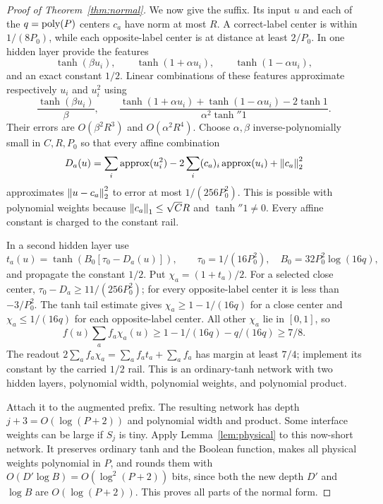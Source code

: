 \begin{proof}[Proof of Theorem~\ref{thm:normal}]
We now give the suffix. Its input $u$ and each of the $q=\operatorname{poly}(P)$
centers $c_a$ have norm at most $R$. A correct-label center is
within $1/(8P_0)$, while each opposite-label center is at distance
at least $2/P_0$. In one hidden layer provide the features
\[
 \tanh(\beta u_i),\qquad
 \tanh(1+\alpha u_i),\qquad\tanh(1-\alpha u_i),
\]
and an exact constant $1/2$. Linear combinations of these features
approximate respectively $u_i$ and $u_i^2$ using
\[
 \frac{\tanh(\beta u_i)}\beta,\qquad
 \frac{\tanh(1+\alpha u_i)+\tanh(1-\alpha u_i)-2\tanh1}
      {\alpha^2\tanh''1}.
\]
Their errors are $O(\beta^2R^3)$ and $O(\alpha^2R^4)$.
Choose $\alpha,\beta$ inverse-polynomially small in
$C,R,P_0$ so that every affine combination
\[
 D_a(u)=\sum_i\operatorname{approx}(u_i^2)
       -2\sum_i(c_a)_i\operatorname{approx}(u_i)+\left\lVert c_a\right\rVert_2^2
\]
approximates $\left\lVert u-c_a\right\rVert_2^2$ to error at most
$1/(256P_0^2)$. This is possible with polynomial weights because
$\left\lVert c_a\right\rVert_1\le\sqrt C R$ and $\tanh''1\ne0$.
Every affine constant is charged to the constant rail.

In a second hidden layer use
\[
 t_a(u)=\tanh(B_0[\tau_0-D_a(u)]),\qquad
 \tau_0=1/(16P_0^2),\quad B_0=32P_0^2\log(16q),
\]
and propagate the constant $1/2$. Put $\chi_a=(1+t_a)/2$.
For a selected close center, $\tau_0-D_a\ge11/(256P_0^2)$;
for every opposite-label center it is less than $-3/P_0^2$.
The tanh tail estimate gives $\chi_a\ge1-1/(16q)$ for a close
center and $\chi_a\le1/(16q)$ for each opposite-label center.
All other $\chi_a$ lie in $[0,1]$, so
\[
 f(u)\sum_a f_a\chi_a(u)\ge1-1/(16q)-q/(16q)\ge7/8.
\]
The readout $2\sum_af_a\chi_a=\sum_af_at_a+\sum_af_a$
has margin at least $7/4$; implement its constant by the carried
$1/2$ rail. This is an ordinary-tanh network with two hidden
layers, polynomial width, polynomial weights, and polynomial product.

Attach it to the augmented prefix. The resulting network has
depth $j+3=O(\log(P+2))$ and polynomial width and product.
Some interface weights can be large if $S_j$ is tiny. Apply
Lemma~\ref{lem:physical} to this now-short network. It preserves
ordinary tanh and the Boolean function, makes all physical weights
polynomial in $P$, and rounds them with
$O(D'\log B)=O(\log^2(P+2))$ bits, since both the new depth
$D'$ and $\log B$ are $O(\log(P+2))$.
This proves all parts of the normal form.
\end{proof}

